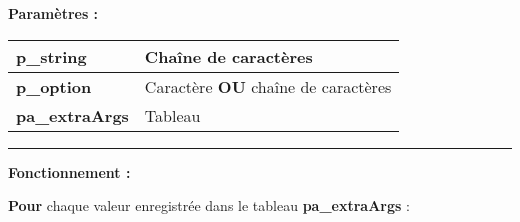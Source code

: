 \documentclass[a4paper,10pt]{article}
\begin{document}
    \begin{justify}
        \textbf{Paramètres :}

        \begin{tabular}{|l|l|}
            \hline
            \textbf{\color{vars}p\_string} & Chaîne de caractères\\
            \hline
            \textbf{\color{vars}p\_option} & Caractère \textbf{OU} chaîne de caractères\\
            \hline
            \textbf{\color{vars}pa\_extraArgs} & Tableau\\
            \hline
        \end{tabular}
    \end{justify}

    \setlength{\parskip}{2em}


    \par\noindent\rule{\textwidth}{0.4pt}

    \setlength{\parskip}{1em}

    \begin{justify}
        \textbf{Fonctionnement :}

        \textbf{\color{loop}Pour} chaque valeur enregistrée dans le tableau \textbf{\color{vars}pa\_extraArgs} :
    \end{justify}
\end{document}
